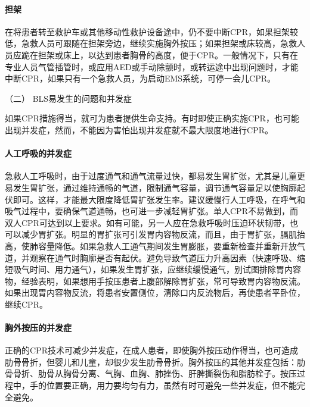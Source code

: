 \paragraph{担架}

在将患者转至救护车或其他移动性救护设备途中，仍不要中断CPR，如果担架较低，急救人员可跟随在担架旁边，继续实施胸外按压；如果担架或床较高，急救人员应跪在担架或床上，以达到患者胸骨的高度，便于CPR。一般情况下，只有在专业人员气管插管时，或应用AED或手动除颤时，或转运途中出现问题时，才能中断CPR，如果只有一个急救人员，为启动EMS系统，可停一会儿CPR。

\hypertarget{text00283.htmlux5cux23CHP10-1-4-6-2}{}
（二） BLS易发生的问题和并发症

如果CPR措施得当，就可为患者提供生命支持。有时即使正确实施CPR，也可能出现并发症，然而，不能因为害怕出现并发症就不最大限度地进行CPR。

\paragraph{人工呼吸的并发症}

急救人工呼吸时，由于过度通气和通气流量过快，都易发生胃扩张，尤其是儿童更易发生胃扩张，通过维持通畅的气道，限制通气容量，调节通气容量足以使胸廓起伏即可。这样，才能最大限度降低胃扩张发生率。建议缓慢行人工呼吸，在呼气和吸气过程中，要确保气道通畅，也可进一步减轻胃扩张。单人CPR不易做到，而双人CPR可达到以上要求。如有可能，另一人应在急救呼吸时压迫环状韧带，也可以减少胃扩张。明显的胃扩张可引发胃内容物反流，而且，由于胃扩张，膈肌抬高，使肺容量降低。如果急救人工通气期间发生胃膨胀，要重新检查并重新开放气道，并观察在通气时胸廓是否有起伏。避免导致气道压力升高因素（快速呼吸、缩短吸气时间、用力通气），如果发生胃扩张，应继续缓慢通气，别试图排除胃内容物，经验表明，如果想用手按压患者上腹部解除胃扩张，常可导致胃内容物反流。如果出现胃内容物反流，将患者安置侧位，清除口内反流物后，再使患者平卧位，继续CPR。

\paragraph{胸外按压的并发症}

正确的CPR技术可减少并发症，在成人患者，即使胸外按压动作得当，也可造成肋骨骨折，但婴儿和儿童，却很少发生肋骨骨折。胸外按压的其他并发症包括：肋骨骨折、肋骨从胸骨分离、气胸、血胸、肺挫伤、肝脾撕裂伤和脂肪栓子。按压过程中，手的位置要正确，用力要均匀有力，虽然有时可避免一些并发症，但不能完全避免。

